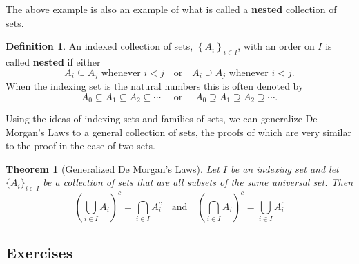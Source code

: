 \documentclass[
]{book}
\newtheorem{theorem}{Theorem}[chapter]
\theoremstyle{definition}
\newtheorem{definition}{Definition}[chapter]
\theoremstyle{definition}
\theoremstyle{definition}
\theoremstyle{remark}
\begin{document}
The above example is also an example of what is called a \textbf{nested} collection of sets.

\begin{definition}
\protect\hypertarget{def:unnamed-chunk-35}{}{\label{def:unnamed-chunk-35} } An indexed collection of sets, \(\left\{ A_i\right\}_{i\in I}\), with an order on \(I\) is called \textbf{nested} if either
\[ A_i \subseteq A_j \mbox{ whenever } i<j \quad \mbox{or} \quad A_i \supseteq A_j \mbox{ whenever } i<j.\]
When the indexing set is the natural numbers this is often denoted by \[A_0 \subseteq A_1 \subseteq A_2 \subseteq \cdots \quad \mbox{ or } \quad A_0 \supseteq A_1 \supseteq A_2 \supseteq \cdots.\]
\end{definition}

Using the ideas of indexing sets and families of sets, we can generalize De Morgan's Laws to a general collection of sets, the proofs of which are very similar to the proof in the case of two sets.

\begin{theorem}[Generalized De Morgan's Laws]
\protect\hypertarget{thm:unnamed-chunk-36}{}{\label{thm:unnamed-chunk-36} {} }Let \(I\) be an indexing set and let \(\{A_i\}_{i\in I}\) be a collection of sets that are all subsets of the same universal set. Then
\[\left( \bigcup_{i\in I} A_i \right)^c = \bigcap_{i \in I} A_i^c \quad \mbox{and} \quad \left( \bigcap_{i\in I} A_i \right)^c = \bigcup_{i \in I} A_i^c\]
\end{theorem}

\hypertarget{exercises-5}{%
\subsection{Exercises}\label{exercises-5}}
\end{document}

